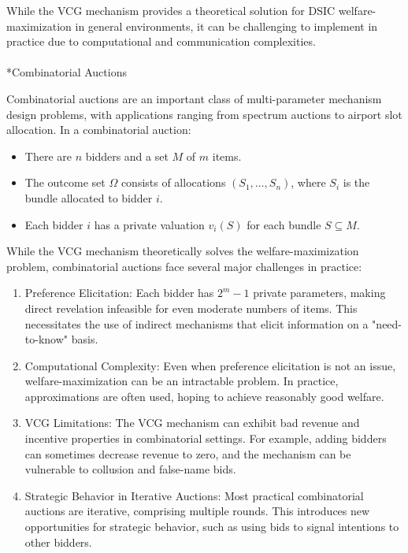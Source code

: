 \documentclass[
  letterpaper,
  numbers=noenddot,
  DIV=11]{scrreprt}
\makeatletter
\let\oldparagraph\paragraph
\renewcommand{\paragraph}{
    \@ifstar
      \xxxParagraphStar
      \xxxParagraphNoStar
  }
\newcommand{\xxxParagraphStar}[1]{\oldparagraph*{#1}\mbox{}}
\newcommand{\xxxParagraphNoStar}[1]{\oldparagraph{#1}\mbox{}}
\theoremstyle{plain}
\theoremstyle{definition}
\theoremstyle{plain}
\theoremstyle{remark}
\makeatother
\begin{document}
While the VCG mechanism provides a theoretical solution for DSIC
welfare-maximization in general environments, it can be challenging to
implement in practice due to computational and communication
complexities.

\paragraph*{Combinatorial Auctions}\label{combinatorial-auctions}

Combinatorial auctions are an important class of multi-parameter
mechanism design problems, with applications ranging from spectrum
auctions to airport slot allocation. In a combinatorial auction:

\begin{itemize}
\item
  There are \(n\) bidders and a set \(M\) of \(m\) items.
\item
  The outcome set \(\Omega\) consists of allocations
  \((S_1, \ldots, S_n)\), where \(S_i\) is the bundle allocated to
  bidder \(i\).
\item
  Each bidder \(i\) has a private valuation \(v_i(S)\) for each bundle
  \(S \subseteq M\).
\end{itemize}

While the VCG mechanism theoretically solves the welfare-maximization
problem, combinatorial auctions face several major challenges in
practice:

\begin{enumerate}
\def\labelenumi{\arabic{enumi}.}
\item
  Preference Elicitation: Each bidder has \(2^m - 1\) private
  parameters, making direct revelation infeasible for even moderate
  numbers of items. This necessitates the use of indirect mechanisms
  that elicit information on a "need-to-know" basis.
\item
  Computational Complexity: Even when preference elicitation is not an
  issue, welfare-maximization can be an intractable problem. In
  practice, approximations are often used, hoping to achieve reasonably
  good welfare.
\item
  VCG Limitations: The VCG mechanism can exhibit bad revenue and
  incentive properties in combinatorial settings. For example, adding
  bidders can sometimes decrease revenue to zero, and the mechanism can
  be vulnerable to collusion and false-name bids.
\item
  Strategic Behavior in Iterative Auctions: Most practical combinatorial
  auctions are iterative, comprising multiple rounds. This introduces
  new opportunities for strategic behavior, such as using bids to signal
  intentions to other bidders.
\end{enumerate}
\end{document}

